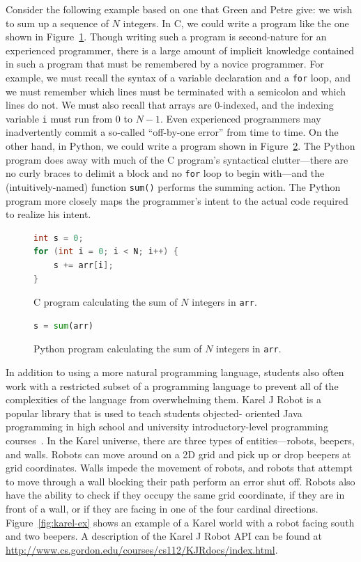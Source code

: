 \documentclass[11pt]{article}
\begin{document}
Consider the following example based on one that Green and Petre give: we wish to sum up a sequence
of $N$ integers. In C, we could write a program like the one shown in Figure~\ref{fig:c-prog}.
Though writing such a program is second-nature for an experienced programmer, there is a large
amount of implicit knowledge contained in such a program that must be remembered by a novice
programmer. For example, we must recall the syntax of a variable declaration and a \texttt{for}
loop, and we must remember which lines must be terminated with a semicolon and which lines do not.
We must also recall that arrays are 0-indexed, and the indexing variable \texttt{i} must run from 0
to $N - 1$. Even experienced programmers may inadvertently commit a so-called ``off-by-one error''
from time to time. On the other hand, in Python, we could write a program shown in
Figure~\ref{fig:python-prog}. The Python program does away with much of the C program's
syntactical clutter---there are no curly braces to delimit a block and no \texttt{for} loop to
begin with---and the (intuitively-named) function \texttt{sum()} performs the summing action.  The
Python program more closely maps the programmer's intent to the actual code required to realize his
intent.

\begin{figure}[ht]
\begin{lstlisting}[language=C]
int s = 0;
for (int i = 0; i < N; i++) {
    s += arr[i];
}
\end{lstlisting}
\label{fig:c-prog}
\caption{C program calculating the sum of $N$ integers in \texttt{arr}.}
\end{figure}

\begin{figure}[ht]
\begin{lstlisting}[language=python]
s = sum(arr)
\end{lstlisting}
\label{fig:python-prog}
\caption{Python program calculating the sum of $N$ integers in \texttt{arr}.}
\end{figure}

In addition to using a more natural programming language, students also often work with a
restricted subset of a programming language to prevent all of the complexities of the language from
overwhelming them. Karel J Robot is a popular library that is used to teach students objected-
oriented Java programming in high school and university introductory-level programming
courses~\cite{Bergin:2013aa}. In the Karel universe, there are three types of entities---robots,
beepers, and walls. Robots can move around on a 2D grid and pick up or drop beepers at grid
coordinates. Walls impede the movement of robots, and robots that attempt to move through a wall
blocking their path perform an error shut off. Robots also have the ability to check if they occupy
the same grid coordinate, if they are in front of a wall, or if they are facing in one of the four
cardinal directions. Figure~\ref{fig:karel-ex} shows an example of a Karel world with a robot
facing south and two beepers. A description of the Karel J Robot API can be found at
\url{http://www.cs.gordon.edu/courses/cs112/KJRdocs/index.html}.
\end{document}
